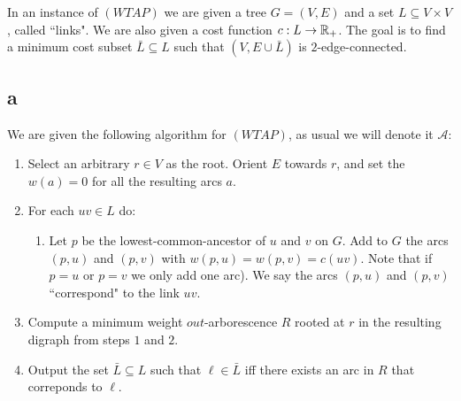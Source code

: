 \documentclass[letterpaper,12pt,oneside,onecolumn]{article}
\newcommand{\cA}{\mathcal{A}} \newcommand{\cB}{\mathcal{B}}
\begin{document}
\section{}
\paragraph{}
In an instance of $(WTAP)$ we are given a tree $G=(V,E)$ and a set $L \subseteq V\times V$, called ``links". We are also given a cost function $c: L \rightarrow \mathbb{R}_+$. The goal is to find a minimum cost subset $\bar{L} \subseteq L$ such that $(V, E \cup \bar{L})$ is $2$-edge-connected.
\subsection{a}
We are given the following algorithm for $(WTAP)$, as usual we will denote it $\cA$:
\begin{enumerate}
\item Select an arbitrary $r \in V$ as the root. Orient $E$ towards $r$, and set the $w(a) = 0$ for all the resulting arcs $a$.
\item For each $uv \in L$ do:
	\begin{enumerate}
	\item Let $p$ be the lowest-common-ancestor of $u$ and $v$ on $G$. Add to $G$ the arcs $(p,u)$ and $(p,v)$ with $w(p,u) = w(p,v) = c(uv)$. Note that if $p=u$ or $p=v$ we only add one arc). We say the arcs $(p,u)$ and $(p,v)$ ``correspond" to the link $uv$.
	\end{enumerate}
\item Compute a minimum weight $out$-arborescence $R$ rooted at $r$ in the resulting digraph from steps $1$ and $2$.
\item Output the set $\bar{L} \subseteq L$ such that $\ell \in \bar{L}$ iff there exists an arc in $R$ that correponds to $\ell$.
\end{enumerate}
\end{document}
